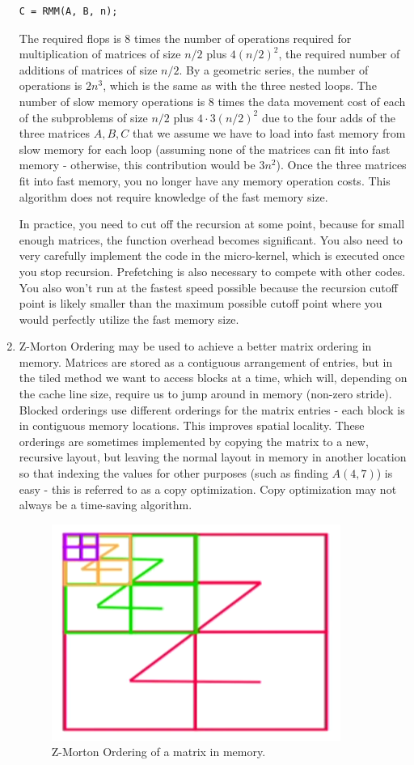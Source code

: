 \documentclass[10pt]{article}
\begin{document}
\begin{flushleft}
\begin{enumerate}
\begin{lstlisting}
C = RMM(A, B, n);
\end{lstlisting}

The required flops is 8 times the number of operations required for multiplication of matrices of size \(n/2\) plus \(4(n/2)^2\), the required number of additions of matrices of size \(n/2\). By a geometric series, the number of operations is \(2n^3\), which is the same as with the three nested loops. The number of slow memory operations is 8 times the data movement cost of each of the subproblems of size \(n/2\) plus \(4\cdot3(n/2)^2\) due to the four adds of the three matrices \(A, B, C\) that we assume we have to load into fast memory from slow memory for each loop (assuming none of the matrices can fit into fast memory - otherwise, this contribution would be \(3n^2\)). Once the three matrices fit into fast memory, you no longer have any memory operation costs. This algorithm does not require knowledge of the fast memory size.

In practice, you need to cut off the recursion at some point, because for small enough matrices, the function overhead becomes significant. You also need to very carefully implement the code in the micro-kernel, which is executed once you stop recursion. Prefetching is also necessary to compete with other codes. You also won't run at the fastest speed possible because the recursion cutoff point is likely smaller than the maximum possible cutoff point where you would perfectly utilize the fast memory size.

\item Z-Morton Ordering may be used to achieve a better matrix ordering in memory. Matrices are stored as a contiguous arrangement of entries, but in the tiled method we want to access blocks at a time, which will, depending on the cache line size, require us to jump around in memory (non-zero stride). Blocked orderings use different orderings for the matrix entries - each block is in contiguous memory locations. This improves spatial locality. These orderings are sometimes implemented by copying the matrix to a new, recursive layout, but leaving the normal layout in memory in another location so that indexing the values for other purposes (such as finding \(A(4,7)\)) is easy - this is referred to as a copy optimization. Copy optimization may not always be a time-saving algorithm.

\begin{figure}[H]
\centering
\includegraphics[width=0.25\linewidth]{figures/Z-morton-ordering.pdf}
\caption{Z-Morton Ordering of a matrix in memory.}
\end{figure}


\end{enumerate}
\end{flushleft}
\end{document}
